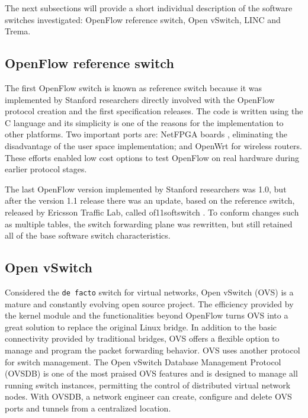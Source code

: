 The next subsections will provide a short individual description of the software switches investigated: OpenFlow reference switch, Open vSwitch, LINC and Trema. 

    \subsection{OpenFlow reference switch}
    \label{sec:sec221}
    
     The first OpenFlow switch is known as reference switch because it was implemented by Stanford researchers directly involved with the OpenFlow protocol creation and the first specification releases. The code is written using the C language and its simplicity is one of the reasons for the implementation to other platforms. Two important ports are: NetFPGA boards \cite{netpfgaof}, eliminating the disadvantage of the user space implementation; and OpenWrt \cite{pantou} for wireless routers. These efforts enabled low cost options to test OpenFlow on real hardware during earlier protocol stages.    
     
     The last OpenFlow version implemented by Stanford researchers was 1.0, but after the version 1.1 release there was an update, based on the reference switch, released by Ericsson Traffic Lab, called of11softswitch \cite{of11softswitch}. To conform changes such as multiple tables, the switch forwarding plane was rewritten, but still retained all of the base software switch characteristics.     

     \subsection{Open vSwitch}
    
    Considered the \texttt{de facto} switch for virtual networks, Open vSwitch \cite{Pfaff_e.a.:extending} (OVS) is a mature and constantly evolving open source project. The efficiency provided by the kernel module and the functionalities beyond OpenFlow turns OVS into a great solution to replace the original Linux bridge. In addition to the basic connectivity provided by traditional bridges, OVS offers a flexible option to manage and program the packet forwarding behavior. OVS uses another protocol for switch management. The Open vSwitch Database Management Protocol (OVSDB) is one of the most praised OVS features and is designed to manage all running switch instances, permitting the control of distributed virtual network nodes. With OVSDB, a network engineer can create, configure and delete OVS ports and tunnels from a centralized location.

